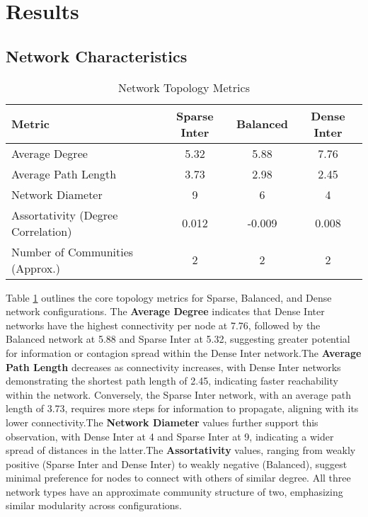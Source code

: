 \documentclass[12pt,a4paper]{article}
\begin{document}
\section{Results}
\subsection{Network Characteristics}
\begin{table}[H]
\centering
\caption{Network Topology Metrics}
\begin{tabular}{lccc}
\toprule
\textbf{Metric} & \textbf{Sparse Inter} & \textbf{Balanced} & \textbf{Dense Inter} \\
\midrule
Average Degree & 5.32 & 5.88 & 7.76 \\
Average Path Length & 3.73 & 2.98 & 2.45 \\
Network Diameter & 9 & 6 & 4 \\
Assortativity (Degree Correlation) & 0.012 & -0.009 & 0.008 \\
Number of Communities (Approx.) & 2 & 2 & 2 \\
\bottomrule
\end{tabular}
\label{tab:network_topology_metrics}
\end{table}
Table \ref{tab:network_topology_metrics} outlines the core topology metrics for Sparse, Balanced, and Dense network configurations. The \textbf{Average Degree} indicates that Dense Inter networks have the highest connectivity per node at 7.76, followed by the Balanced network at 5.88 and Sparse Inter at 5.32, suggesting greater potential for information or contagion spread within the Dense Inter network.The \textbf{Average Path Length} decreases as connectivity increases, with Dense Inter networks demonstrating the shortest path length of 2.45, indicating faster reachability within the network. Conversely, the Sparse Inter network, with an average path length of 3.73, requires more steps for information to propagate, aligning with its lower connectivity.The \textbf{Network Diameter} values further support this observation, with Dense Inter at 4 and Sparse Inter at 9, indicating a wider spread of distances in the latter.The \textbf{Assortativity} values, ranging from weakly positive (Sparse Inter and Dense Inter) to weakly negative (Balanced), suggest minimal preference for nodes to connect with others of similar degree. All three network types have an approximate community structure of two, emphasizing similar modularity across configurations.
\end{document}
